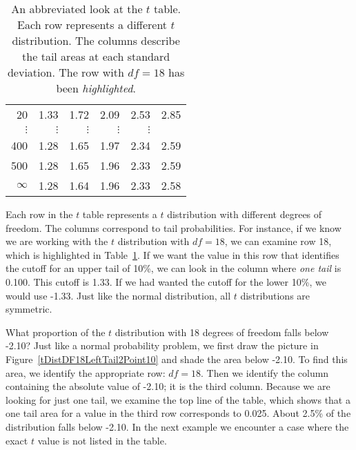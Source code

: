 \begin{table}[hht]
\begin{tabular}{r | rrr rr}
20  &  {\normalsize  1.33} & {\normalsize  1.72} & {\normalsize  2.09} & {\normalsize  2.53} & {\normalsize  2.85}  \\ 
$\vdots$ & $\vdots$ &$\vdots$ &$\vdots$ &$\vdots$ & \\
400  &  {\normalsize  1.28} & {\normalsize  1.65} & {\normalsize  1.97} & {\normalsize  2.34} & {\normalsize  2.59}  \\ 
500  &  {\normalsize  1.28} & {\normalsize  1.65} & {\normalsize  1.96} & {\normalsize  2.33} & {\normalsize  2.59}  \\ 
$\infty$  &  {\normalsize  1.28} & {\normalsize  1.64} & {\normalsize  1.96} & {\normalsize  2.33} & {\normalsize  2.58}  \\ 
\end{tabular}
\caption{An abbreviated look at the $t$ table. Each row represents a different $t$ distribution. The columns describe the tail areas at each standard deviation. The row with $df=18$ has been {\em\color{tableHLBlue}highlighted}.}
\label{tTableSample}
\end{table}

Each row in the $t$ table represents a $t$ distribution with different degrees of freedom. The columns correspond to tail probabilities. For instance, if we know we are working with the $t$ distribution with $df=18$, we can examine row 18, which is highlighted in Table~\ref{tTableSample}. If we want the value in this row that identifies the cutoff for an upper tail of 10\%, we can look in the column where \emph{one tail} is 0.100. This cutoff is 1.33. If we had wanted the cutoff for the lower 10\%, we would use -1.33. Just like the normal distribution, all $t$ distributions are symmetric.

\begin{example}{What proportion of the $t$ distribution with 18 degrees of freedom falls below -2.10?}
Just like a normal probability problem, we first draw the picture in Figure~\ref{tDistDF18LeftTail2Point10} and shade the area below -2.10. To find this area, we identify the appropriate row: $df=18$. Then we identify the column containing the absolute value of -2.10; it is the third column. Because we are looking for just one tail, we examine the top line of the table, which shows that a one tail area for a value in the third row corresponds to 0.025. About 2.5\% of the distribution falls below -2.10. In the next example we encounter a case where the exact $t$ value is not listed in the table.
\end{example}

